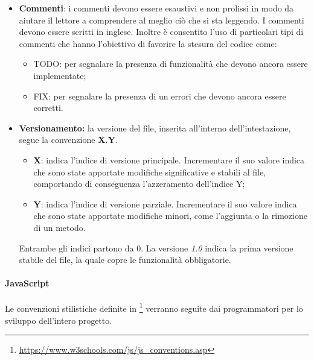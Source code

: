 \begin{itemize}
	\item \textbf{Commenti}: i commenti devono essere esaustivi e non prolissi in modo da aiutare il lettore a comprendere al meglio ciò che si sta leggendo. I commenti devono essere scritti in inglese. Inoltre è consentito l'uso di particolari tipi di commenti che hanno l'obiettivo di favorire la stesura del codice come:
	\begin{itemize}
		\item TODO: per segnalare la presenza di funzionalità che devono ancora essere implementate;
		\item FIX: per segnalare la presenza di un errori che devono ancora essere corretti.
	\end{itemize}

	\item \textbf{Versionamento:} la versione del file, inserita all'interno dell'intestazione, segue la convenzione \textbf{X.Y}. 
	\begin{itemize}
		\item{\textbf{X}: indica l'indice di versione principale. Incrementare il suo valore indica che sono state apportate modifiche significative e stabili al file, comportando di conseguenza l'azzeramento dell'indice Y;}
		\item{\textbf{Y}: indica l'indice di versione parziale. Incrementare il suo valore indica che sono state apportate modifiche minori, come l'aggiunta o la rimozione di un metodo.}
	\end{itemize}
	Entrambe gli indici partono da 0. La versione \emph{1.0} indica la prima versione stabile del file, la quale copre le funzionalità obbligatorie. 
\end{itemize}

\paragraph{JavaScript}\Spazio
Le convenzioni stilistiche definite in \footnote{\url{https://www.w3schools.com/js/js_conventions.asp}} verranno seguite dai programmatori per lo sviluppo dell'intero progetto.

